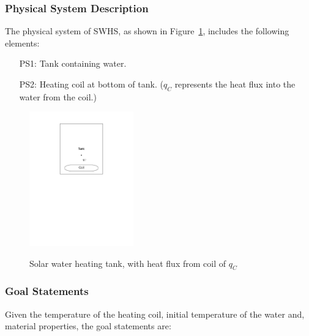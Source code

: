 \documentclass[12pt]{article}
\newcommand{\progname}{SWHS}
\begin{document}
\subsubsection{Physical System Description}

The physical system of \progname{}, as shown in Figure~\ref{Fig_Tank},
includes the following elements:

\begin{itemize}

\item[PS1:] Tank containing water.

\item[PS2:] Heating coil at bottom of tank.  ($q_C$ represents the heat flux  into the water
  from the coil.)


\end{itemize}

\begin{figure}[h!]
\begin{center}
{
 \includegraphics[width=0.4\textwidth]{TankWaterOnly.pdf}
}
\caption{\label{Fig_Tank} Solar water heating tank, with heat flux from coil of $q_C$}
\end{center}
\end{figure}

\subsubsection{Goal Statements}

\noindent Given the temperature of the heating coil, initial temperature of 
the water
and, material properties, the goal statements are:
\end{document}
